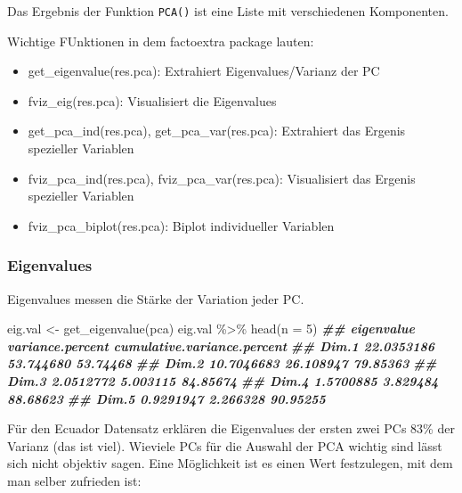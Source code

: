 \documentclass[
]{article}
\newenvironment{Shaded}{\begin{snugshade}}{\end{snugshade}}
\newcommand{\AttributeTok}[1]{\textcolor[rgb]{0.77,0.63,0.00}{#1}}
\newcommand{\DecValTok}[1]{\textcolor[rgb]{0.00,0.00,0.81}{#1}}
\newcommand{\DocumentationTok}[1]{\textcolor[rgb]{0.56,0.35,0.01}{\textbf{\textit{#1}}}}
\newcommand{\FunctionTok}[1]{\textcolor[rgb]{0.00,0.00,0.00}{#1}}
\newcommand{\NormalTok}[1]{#1}
\newcommand{\OtherTok}[1]{\textcolor[rgb]{0.56,0.35,0.01}{#1}}
\newcommand{\SpecialCharTok}[1]{\textcolor[rgb]{0.00,0.00,0.00}{#1}}
\providecommand{\tightlist}{%
  \setlength{\itemsep}{0pt}\setlength{\parskip}{0pt}}
\begin{document}
Das Ergebnis der Funktion \texttt{PCA()} ist eine Liste mit verschiedenen Komponenten.

Wichtige FUnktionen in dem factoextra package lauten:

\begin{itemize}
\tightlist
\item
  get\_eigenvalue(res.pca): Extrahiert Eigenvalues/Varianz der PC
\item
  fviz\_eig(res.pca): Visualisiert die Eigenvalues
\item
  get\_pca\_ind(res.pca), get\_pca\_var(res.pca): Extrahiert das Ergenis spezieller Variablen
\item
  fviz\_pca\_ind(res.pca), fviz\_pca\_var(res.pca): Visualisiert das Ergenis spezieller Variablen
\item
  fviz\_pca\_biplot(res.pca): Biplot individueller Variablen
\end{itemize}

\hypertarget{eigenvalues}{%
\subsubsection{Eigenvalues}\label{eigenvalues}}

Eigenvalues messen die Stärke der Variation jeder PC.

\begin{Shaded}
\begin{Highlighting}[]

\NormalTok{eig.val }\OtherTok{\textless{}{-}} \FunctionTok{get\_eigenvalue}\NormalTok{(pca)}
\NormalTok{eig.val }\SpecialCharTok{\%\textgreater{}\%}
  \FunctionTok{head}\NormalTok{(}\AttributeTok{n =} \DecValTok{5}\NormalTok{)}
\DocumentationTok{\#\#       eigenvalue variance.percent cumulative.variance.percent}
\DocumentationTok{\#\# Dim.1 22.0353186        53.744680                    53.74468}
\DocumentationTok{\#\# Dim.2 10.7046683        26.108947                    79.85363}
\DocumentationTok{\#\# Dim.3  2.0512772         5.003115                    84.85674}
\DocumentationTok{\#\# Dim.4  1.5700885         3.829484                    88.68623}
\DocumentationTok{\#\# Dim.5  0.9291947         2.266328                    90.95255}
\end{Highlighting}
\end{Shaded}

Für den Ecuador Datensatz erklären die Eigenvalues der ersten zwei PCs 83\% der Varianz (das ist viel). Wieviele PCs für die Auswahl der PCA wichtig sind lässt sich nicht objektiv sagen. Eine Möglichkeit ist es einen Wert festzulegen, mit dem man selber zufrieden ist:
\end{document}
